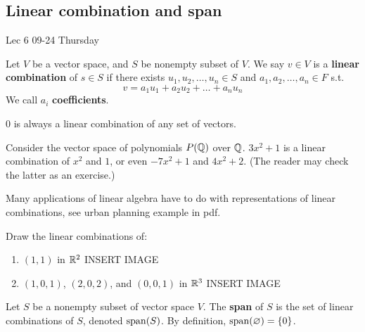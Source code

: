 \documentclass[12pt]{article}
\newcommand{\lecdate}[1]{ %
    \vspace{0in}
    \begin{flushright}
        #1
    \end{flushright}
    \vspace{0in}
}
\begin{document}
\subsection{Linear combination and span}
\lecdate{Lec 6 09-24 Thursday}

\begin{defn}
    Let $V$ be a vector space, and $S$ be nonempty subset of $V$. We say $v \in V$ is a \textbf{linear combination} of $s \in S$ if there exists $u_{1}, u_{2}, \dots, u_{n} \in S$ and $a_{1}, a_{2}, \dots, a_{n} \in F$ s.t. \[
        v = a_{1}u_{1} + a_{2}u_{2} + \dots + a_{n}u_{n}
    \]
    We call $a_{i}$ \textbf{coefficients}.
\end{defn}
\begin{ex}\label{ex:0lincomb}
    $0$ is always a linear combination of any set of vectors.
\end{ex}
\begin{ex}
    Consider the vector space of polynomials $P(\mathbb{Q})$ over $\mathbb{Q}$. $3x^{2} + 1$ is a linear combination of $x^{2}$ and $1$, or even $-7x^{2} + 1$ and $4x^{2} + 2$. (The reader may check the latter as an exercise.)
\end{ex}
\begin{remark}
    Many applications of linear algebra have to do with representations of linear combinations, see urban planning example in pdf.
\end{remark}
\begin{exercise}
    Draw the linear combinations of:
    \begin{enumerate}[label=(\roman*)]
        \item $(1,1)$ in $\mathbb{R}^2$
            INSERT IMAGE
        \item $(1,0,1)$, $(2,0,2)$, and $(0,0,1)$ in $\mathbb{R}^3$
            INSERT IMAGE
    \end{enumerate}
\end{exercise}

\begin{defn}
    Let $S$ be a nonempty subset of vector space $V$. The \textbf{span} of $S$ is the set of linear combinations of $S$, denoted $\operatorname{span}(S)$. By definition, $\operatorname{span}(\varnothing) =  \{ 0 \}$.
\end{defn}
\end{document}
